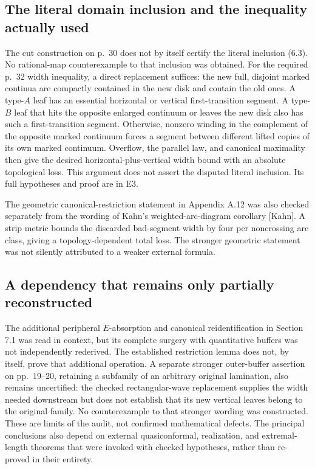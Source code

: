 \documentclass[10pt]{article}
\begin{document}
\subsection*{The literal domain inclusion and the inequality actually used}
The cut construction on p. 30 does not by itself certify the literal inclusion (6.3). No rational-map counterexample to that inclusion was obtained. For the required p. 32 width inequality, a direct replacement suffices: the new full, disjoint marked continua are compactly contained in the new disk and contain the old ones. A type-\(A\) leaf has an essential horizontal or vertical first-transition segment. A type-\(B\) leaf that hits the opposite enlarged continuum or leaves the new disk also has such a first-transition segment. Otherwise, nonzero winding in the complement of the opposite marked continuum forces a segment between different lifted copies of its own marked continuum. Overflow, the parallel law, and canonical maximality then give the desired horizontal-plus-vertical width bound with an absolute topological loss. This argument does not assert the disputed literal inclusion. Its full hypotheses and proof are in E3.\par
The geometric canonical-restriction statement in Appendix A.12 was also checked separately from the wording of Kahn’s weighted-arc-diagram corollary [Kahn]. A strip metric bounds the discarded bad-segment width by four per noncrossing arc class, giving a topology-dependent total loss. The stronger geometric statement was not silently attributed to a weaker external formula.\par
\subsection*{A dependency that remains only partially reconstructed}
The additional peripheral \(E\)-absorption and canonical reidentification in Section 7.1 was read in context, but its complete surgery with quantitative buffers was not independently rederived. The established restriction lemma does not, by itself, prove that additional operation. A separate stronger outer-buffer assertion on pp. 19–20, retaining a subfamily of an arbitrary original lamination, also remains uncertified: the checked rectangular-wave replacement supplies the width needed downstream but does not establish that its new vertical leaves belong to the original family. No counterexample to that stronger wording was constructed. These are limits of the audit, not confirmed mathematical defects. The principal conclusions also depend on external quasiconformal, realization, and extremal-length theorems that were invoked with checked hypotheses, rather than re-proved in their entirety.\par
\end{document}
